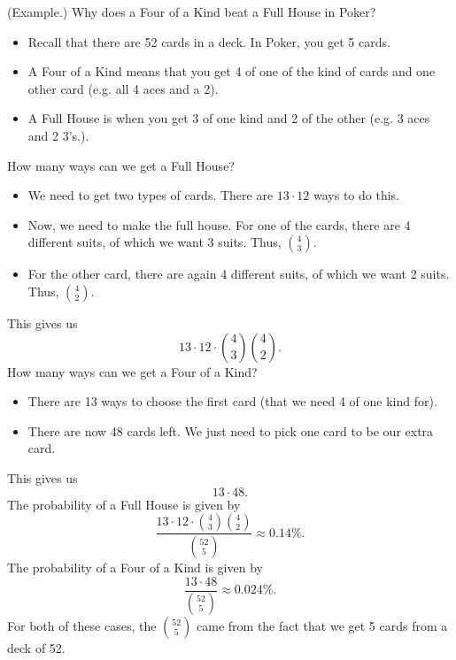 \documentclass[letterpaper]{article}
\begin{document}
\begin{mdframed}[]
    (Example.) Why does a Four of a Kind beat a Full House in Poker? 
    \begin{itemize}
        \item Recall that there are 52 cards in a deck. In Poker, you get 5 cards. 
        \item A Four of a Kind means that you get 4 of one of the kind of cards and one other card (e.g. all 4 aces and a 2).
        \item A Full House is when you get 3 of one kind and 2 of the other (e.g. 3 aces and 2 3's.).
    \end{itemize}

    \begin{mdframed}[]
        How many ways can we get a Full House? 
        \begin{itemize}
            \item We need to get two types of cards. There are $13 \cdot 12$ ways to do this.
            \item Now, we need to make the full house. For one of the cards, there are 4 different suits, of which we want 3 suits. Thus, $\binom{4}{3}$.
            \item For the other card, there are again 4 different suits, of which we want 2 suits. Thus, $\binom{4}{2}$. 
        \end{itemize}
        This gives us 
        \[13 \cdot 12 \cdot \binom{4}{3} \binom{4}{2}.\]
        How many ways can we get a Four of a Kind? 
        \begin{itemize}
            \item There are 13 ways to choose the first card (that we need 4 of one kind for).
            \item There are now 48 cards left. We just need to pick one card to be our extra card.
        \end{itemize}
        This gives us 
        \[13 \cdot 48.\]
        The probability of a Full House is given by 
        \[\frac{13 \cdot 12 \cdot \binom{4}{3} \binom{4}{2}}{\binom{52}{5}} \approx 0.14\%.\]
        The probability of a Four of a Kind is given by 
        \[\frac{13 \cdot 48}{\binom{52}{5}} \approx 0.024\%.\]
        For both of these cases, the $\binom{52}{5}$ came from the fact that we get 5 cards from a deck of 52. 
    \end{mdframed}
\end{mdframed}
\end{document}
